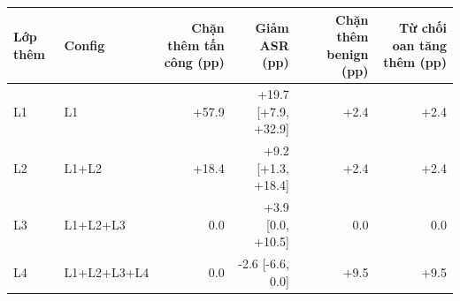 \begin{tabular}{llrrrr}
\toprule
Lớp thêm & Config & Chặn thêm tấn công (pp) & Giảm ASR (pp) & Chặn thêm benign (pp) & Từ chối oan tăng thêm (pp) \\
\midrule
L1 & L1 & +57.9 & +19.7 [+7.9, +32.9] & +2.4 & +2.4 \\
L2 & L1+L2 & +18.4 & +9.2 [+1.3, +18.4] & +2.4 & +2.4 \\
L3 & L1+L2+L3 & 0.0 & +3.9 [0.0, +10.5] & 0.0 & 0.0 \\
L4 & L1+L2+L3+L4 & 0.0 & -2.6 [-6.6, 0.0] & +9.5 & +9.5 \\
\bottomrule
\end{tabular}
